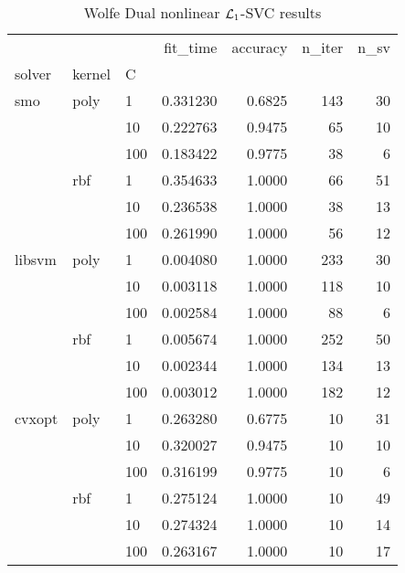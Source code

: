 \begin{table}[H]
\centering
\caption{Wolfe Dual nonlinear $\protect \mathcal{L}_1$-SVC results}
\label{nonlinear_dual_l1_svc_cv_results}
\begin{tabular}{lllrrrr}
\toprule
       &     &     &  fit\_time &  accuracy &  n\_iter &  n\_sv \\
solver & kernel & C &           &           &         &       \\
\midrule
smo & poly & 1   &  0.331230 &    0.6825 &     143 &    30 \\
       &     & 10  &  0.222763 &    0.9475 &      65 &    10 \\
       &     & 100 &  0.183422 &    0.9775 &      38 &     6 \\
       & rbf & 1   &  0.354633 &    1.0000 &      66 &    51 \\
       &     & 10  &  0.236538 &    1.0000 &      38 &    13 \\
       &     & 100 &  0.261990 &    1.0000 &      56 &    12 \\
libsvm & poly & 1   &  0.004080 &    1.0000 &     233 &    30 \\
       &     & 10  &  0.003118 &    1.0000 &     118 &    10 \\
       &     & 100 &  0.002584 &    1.0000 &      88 &     6 \\
       & rbf & 1   &  0.005674 &    1.0000 &     252 &    50 \\
       &     & 10  &  0.002344 &    1.0000 &     134 &    13 \\
       &     & 100 &  0.003012 &    1.0000 &     182 &    12 \\
cvxopt & poly & 1   &  0.263280 &    0.6775 &      10 &    31 \\
       &     & 10  &  0.320027 &    0.9475 &      10 &    10 \\
       &     & 100 &  0.316199 &    0.9775 &      10 &     6 \\
       & rbf & 1   &  0.275124 &    1.0000 &      10 &    49 \\
       &     & 10  &  0.274324 &    1.0000 &      10 &    14 \\
       &     & 100 &  0.263167 &    1.0000 &      10 &    17 \\
\bottomrule
\end{tabular}
\end{table}
